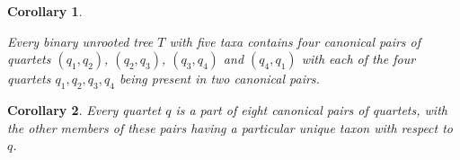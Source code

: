\documentclass[10pt,a4paper]{article}
\newtheorem{corollary}{Corollary}[theorem]
\begin{document}

\vspace{-3pt}
\begin{corollary}
\label{cor:two-pair-quartets}
 
Every binary unrooted tree $T$ with five taxa contains four canonical pairs of quartets $(q_1,q_2)$, $(q_2,q_3)$, $(q_3,q_4)$ and $(q_4,q_1)$ with each of the four quartets $q_1, q_2, q_3, q_4$ being present in two canonical pairs. 
\end{corollary}

\vspace{-7pt}
\begin{corollary}
\label{cor:eight-pairs}
Every quartet $q$ is a part of eight canonical pairs of quartets, with the other members of these pairs having a particular unique taxon with respect to $q$. 
\end{corollary}



\end{document}
